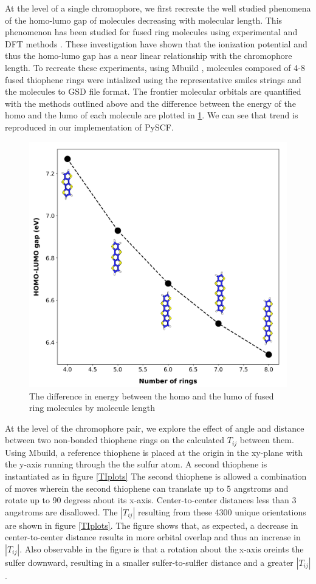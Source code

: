 At the level of a single chromophore, we first recreate the well studied phenomena of the homo-lumo gap of
molecules decreasing with molecular length. 
This phenomenon has been studied for fused ring molecules using experimental and DFT methods \cite{Arago2010}.
These investigation have shown that the ionization potential and thus the homo-lumo gap has a near
linear relationship with the chromophore length. 
To recreate these experiments, using Mbuild \cite{Klein2016}, molecules composed of 4-8 fused thiophene rings
were intialized using the representative smiles strings and the molecules to GSD file format. The frontier
molecular orbitals are quantified with the methods outlined above and the difference between the energy of the
homo and the lumo of each molecule are plotted in \ref{fig:fused}.
We can see that trend is reproduced in our implementation of PySCF.

\begin{figure}
  \center
  \includegraphics[width = .8\textwidth]{figures/fused-ring-figure.png}
  \caption{The difference in energy between the homo and the lumo of fused ring molecules by molecule length}
  \label{fig:fused}
\end{figure}

At the level of the chromophore pair, we explore the effect of angle and distance between two non-bonded
thiophene rings on the calculated $T_{ij}$ between them.
Using Mbuild, a reference thiophene is placed at the origin in the xy-plane
with the y-axis running through the the sulfur atom. 
A second thiophene is instantiated as in figure \ref{TIplots}
The second thiophene is allowed a combination of moves wherein the second thiophene can translate up to 5 angstroms 
and rotate up to 90 degress about its x-axis. Center-to-center distances less than 3 angstroms are disallowed. 
The $|T_{ij}|$ resulting from these 4300 unique orientations are shown in figure \ref{TIplots}. The figure shows that, as expected, a
decrease in 
center-to-center distance results in more orbital overlap and thus an increase in $|T_{ij}|$. Also observable in the figure is that
a rotation about the x-axis oreints the sulfer downward, resulting in a smaller sulfer-to-sulfler distance 
and a greater $|T_{ij}|$. 

